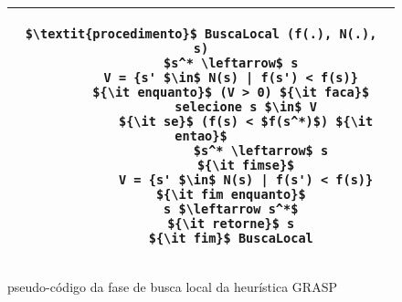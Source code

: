\begin{figure}[H]
    \begin{center}
       \begin{tabular}{c} \hline
        \begin{lstlisting}[mathescape] 
		$\textit{procedimento}$ BuscaLocal (f(.), N(.), s)
		$s^* \leftarrow$ s
		V = {s' $\in$ N(s) | f(s') < f(s)}
		${\it enquanto}$ (V > 0) ${\it faca}$
			selecione s $\in$ V
			${\it se}$ (f(s) < $f(s^*)$) ${\it entao}$
				$s^* \leftarrow$ s
			${\it fimse}$
			V = {s' $\in$ N(s) | f(s') < f(s)}
		${\it fim enquanto}$
		s $\leftarrow s^*$
		${\it retorne}$ s
		${\it fim}$ BuscaLocal
	\end{lstlisting}\\
	\hline
 	\end{tabular}
     \end{center}
\caption{pseudo-código da fase de busca local da heurística GRASP}
\label{local_search_phase}
 \end{figure}

